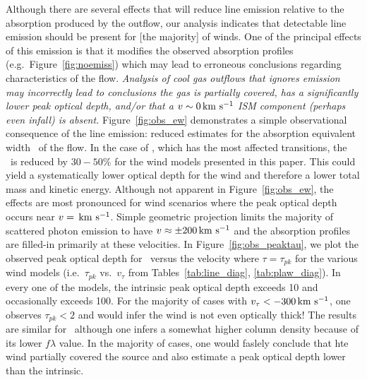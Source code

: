 \documentclass[12pt,preprint]{aastex}
\begin{document}
Although there are several effects that will reduce line emission
relative to the absorption produced by the outflow, our analysis
indicates that detectable line emission should be present for [the
majority] of winds.  One of the principal effects of this emission is
that it modifies the observed absorption profiles (e.g.\
Figure~\ref{fig:noemiss}) which may lead to erroneous conclusions
regarding characteristics of the flow.  {\it Analysis of cool gas outflows
that ignores emission may incorrectly lead to conclusions the gas is
partially covered, has a significantly lower peak optical depth,
and/or that a $v \sim 0 \, {\rm km~s^{-1}}$ ISM component (perhaps even infall) is
absent.}  Figure~\ref{fig:obs_ew} demonstrates a simple observational
consequence of the line emission: reduced estimates for the absorption
equivalent width \ewabs\ of the flow.  In the case of \ion{Mg}{2},
which has the most affected transitions, the \ewabs\ is reduced by
$30-50\%$ for the wind models presented in this paper.  This could
yield a systematically lower optical depth for the wind and therefore
a lower total mass and kinetic energy.  Although not apparent in
Figure~\ref{fig:obs_ew}, the effects are most pronounced for wind
scenarios where the peak optical depth occurs near $v = \, {\rm km~s^{-1}}$.
Simple geometric projection limits the majority of scattered photon emission to
have $v \approx \pm 200 \, {\rm km~s^{-1}}$ and the absorption profiles
are filled-in primarily at these velocities.  In
Figure~\ref{fig:obs_peaktau}, we plot the observed peak optical depth
for \mgiia\ 
versus the velocity where $\tau = \tau_{pk}$ for the various wind models (i.e.\
$\tau_{pk}$ vs.\ $v_\tau$ from Tables~\ref{tab:line_diag},
\ref{tab:plaw_diag}).   In every one of the models, the intrinsic peak
optical depth exceeds 10 and occasionally exceeds 100.  For the
majority of cases with $v_\tau < -300\, {\rm km~s^{-1}}$, one observes $\tau_{pk} <
2$ and would infer the wind is not even optically thick!
The results are similar for \mgiib\ although one infers a somewhat
higher column density because of its lower $f\lambda$ value.
In the majority of cases, one would faslely conclude that hte wind
partially covered the source and also estimate a peak optical depth
lower than the intrinsic. 
\end{document}
